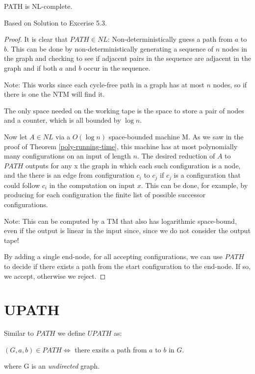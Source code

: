 \begin{thm}
\label{path-nl-complete}
PATH is NL-complete.
\end{thm}

Based on  Solution to Excerise
5.3.

\begin{proof}
It is clear that $PATH \in NL$: Non-deterministically guess a path from
$a$ to $b$. This can be done by non-deterministically generating a sequence of $n$
nodes in the graph and checking to see if adjacent pairs in the sequence are
adjacent in the graph and if both $a$ and $b$ occur in the sequence.

Note: This works since each cycle-free path in a graph has at most $n$ nodes, so if there is one the NTM will find it.

The only space needed on the working tape is the space to store a pair of nodes and a counter, which is all bounded by $\log n$.

Now let $A \in NL$ via a $O(\log n)$ space-bounded machine M. As we saw in the proof of Theorem \ref{poly-running-time},
this machine has at most polynomially many configurations on an input of length $n$.
The desired reduction of $A$ to $PATH$ outputs for any x the
graph in which each such configuration is a node, and the there is an edge
from configuration $c_i$ to $c_j$ if $c_j$ is a configuration that could follow $c_i$ in the computation on
input $x$. This can be done, for example, by producing for each configuration the finite list of possible successor configurations.

Note: This can be computed by a TM that also has logarithmic space-bound, even if the output is linear in the input since,
since we do not consider the output tape!

By adding a single end-node, for all accepting configurations, we can use $PATH$ to decide if there exists a path
from the start configuration to the end-node. If so, we accept, otherwise we reject.
\end{proof}

\section{UPATH}\label{upath}

Similar to $PATH$ we define $UPATH$ as:

$(G, a, b) \in PATH \Leftrightarrow $ there exsits a path from $a$ to
$b$ in $G$.

where G is an \emph{undirected} graph.

